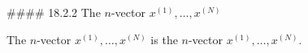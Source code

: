 

#### 18.2.2 The \(n\)-vector \(x^{(1)},\ldots,x^{(N)}\)

The \(n\)-vector \(x^{(1)},\ldots,x^{(N)}\) is the \(n\)-vector \(x^{(1)},\ldots,x^{(N)}\).

